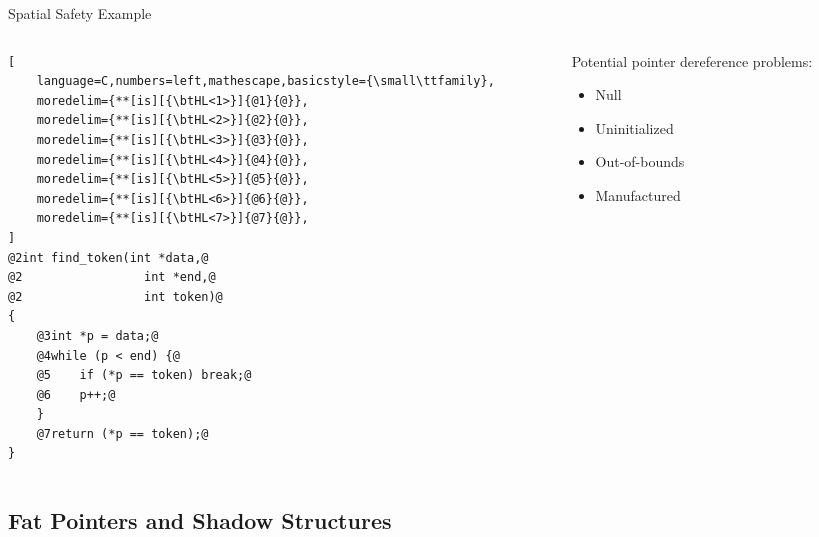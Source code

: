 \documentclass[aspectratio=169]{beamer}
\begin{document}
\begin{frame}[fragile]{Spatial Safety Example}
\begin{columns}[T]
\begin{column}{0.52\textwidth}
\begin{lstlisting}[
    language=C,numbers=left,mathescape,basicstyle={\small\ttfamily},
    moredelim={**[is][{\btHL<1>}]{@1}{@}},
    moredelim={**[is][{\btHL<2>}]{@2}{@}},
    moredelim={**[is][{\btHL<3>}]{@3}{@}},
    moredelim={**[is][{\btHL<4>}]{@4}{@}},
    moredelim={**[is][{\btHL<5>}]{@5}{@}},
    moredelim={**[is][{\btHL<6>}]{@6}{@}},
    moredelim={**[is][{\btHL<7>}]{@7}{@}},
]
@2int find_token(int *data,@
@2                 int *end,@
@2                 int token)@
{
    @3int *p = data;@
    @4while (p < end) {@
    @5    if (*p == token) break;@
    @6    p++;@
    }
    @7return (*p == token);@
}
\end{lstlisting}
\end{column} 
\begin{column}{0.44\textwidth}

\footnotesize{
Potential pointer dereference problems:
  \begin{itemize}[<+->]
      \item Null
      \item Uninitialized
      \item Out-of-bounds 
      \item Manufactured 
  \end{itemize}
}
\end{column}
\end{columns}

\end{frame}

\subsection{Fat Pointers and Shadow Structures}
\end{document}
